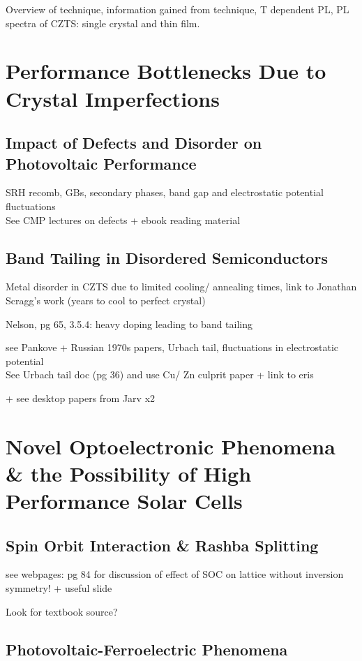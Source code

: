 Overview of technique, information gained from technique, T dependent PL, PL spectra of CZTS: single crystal and thin film.



\section{Performance Bottlenecks Due to Crystal Imperfections}

\subsection{Impact of Defects and Disorder on Photovoltaic Performance}\label{defects_in_PV}
SRH recomb, GBs, secondary phases, band gap and electrostatic potential fluctuations\\
See CMP lectures on defects + ebook reading material 

\subsection{Band Tailing in Disordered Semiconductors}
Metal disorder in CZTS due to limited cooling/ annealing times, link to Jonathan Scragg's work (years to cool to perfect crystal)

Nelson, pg 65, 3.5.4: heavy doping leading to band tailing

see Pankove + Russian 1970s papers, Urbach tail, fluctuations in electrostatic potential\\
See Urbach tail doc (pg 36) and use Cu/ Zn culprit paper + link to eris

+ see desktop papers from Jarv x2




\section{Novel Optoelectronic Phenomena \& the Possibility of High Performance Solar Cells}


\subsection{Spin Orbit Interaction \& Rashba Splitting}
 see webpages: pg 84 for discussion of effect of SOC on lattice without inversion symmetry!  + useful slide

Look for textbook source?

\subsection{Photovoltaic-Ferroelectric Phenomena}\label{FE_PV_section}


